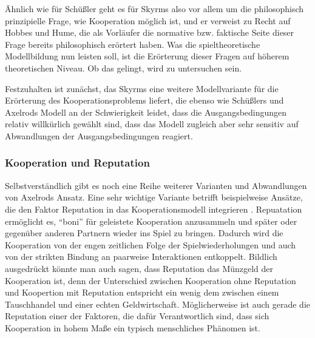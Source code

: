 \documentclass[12pt,a4paper,ngerman]{article}
\begin{document}
Ähnlich wie für Schüßler geht es für Skyrms also vor allem um die
philosophisch prinzipielle Frage, wie Kooperation möglich ist, und er
verweist zu Recht auf Hobbes und Hume, die als Vorläufer die normative
bzw. faktische Seite dieser Frage bereits philosophisch erörtert
haben. Was die spieltheoretische Modellbildung nun leisten soll, ist
die Erörterung dieser Fragen auf höherem theoretischen Niveau. Ob das
gelingt, wird zu untersuchen sein.

Festzuhalten ist zunächst, das Skyrms eine weitere Modellvariante für
die Erörterung des Kooperationsproblems liefert, die ebenso wie
Schüßlers und Axelrods Modell an der Schwierigkeit leidet, dass die
Ausgangsbedingungen relativ willkürlich gewählt sind, dass das Modell
zugleich aber sehr sensitiv auf Abwandlungen der Ausgangsbedingungen
reagiert. 


\subsubsection{Kooperation und Reputation}

Selbstverständlich gibt es noch eine Reihe weiterer Varianten und
Abwandlungen von Axelrods Ansatz. Eine sehr wichtige Variante betrifft
beispielweise Ansätze, die den Faktor Reputation in das
Kooperationsmodell integrieren \cite{abell-reyniers:2000}. Repuatation
ermöglicht es, ``boni'' für geleistete Kooperation anzusammeln und später oder
gegenüber anderen Partnern wieder ins Spiel zu bringen. Dadurch wird die
Kooperation von der engen zeitlichen Folge der Spielwiederholungen und auch von
der strikten Bindung an paarweise Interaktionen entkoppelt. Bildlich
ausgedrückt könnte man auch sagen, dass Reputation das Münzgeld der
Kooperation ist, denn der Unterschied zwischen Kooperation ohne
Reputation und Koopertion mit Reputation entspricht ein wenig dem
zwischen einem Tauschhandel und einer echten
Geldwirtschaft. Möglicherweise ist auch gerade die Reputation einer
der Faktoren, die dafür Verantwortlich sind, dass sich Kooperation in
hohem Maße ein typisch menschliches Phänomen ist.
\end{document}
